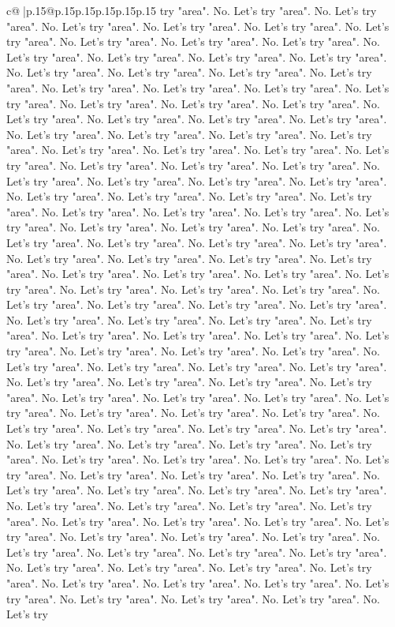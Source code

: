 \documentclass{article}
\begin{document}
{\begin{supertabular}{c@{$\;$}|p{.15\linewidth}@{}p{.15\linewidth}p{.15\linewidth}p{.15\linewidth}p{.15\linewidth}p{.15\linewidth}}
{{{try "area". No. Let's try "area". No. Let's try "area". No. Let's try "area". No. Let's try "area". No. Let's try "area". No. Let's try "area". No. Let's try "area". No. Let's try "area". No. Let's try "area". No. Let's try "area". No. Let's try "area". No. Let's try "area". No. Let's try "area". No. Let's try "area". No. Let's try "area". No. Let's try "area". No. Let's try "area". No. Let's try "area". No. Let's try "area". No. Let's try "area". No. Let's try "area". No. Let's try "area". No. Let's try "area". No. Let's try "area". No. Let's try "area". No. Let's try "area". No. Let's try "area". No. Let's try "area". No. Let's try "area". No. Let's try "area". No. Let's try "area". No. Let's try "area". No. Let's try "area". No. Let's try "area". No. Let's try "area". No. Let's try "area". No. Let's try "area". No. Let's try "area". No. Let's try "area". No. Let's try "area". No. Let's try "area". No. Let's try "area". No. Let's try "area". No. Let's try "area". No. Let's try "area". No. Let's try "area". No. Let's try "area". No. Let's try "area". No. Let's try "area". No. Let's try "area". No. Let's try "area". No. Let's try "area". No. Let's try "area". No. Let's try "area". No. Let's try "area". No. Let's try "area". No. Let's try "area". No. Let's try "area". No. Let's try "area". No. Let's try "area". No. Let's try "area". No. Let's try "area". No. Let's try "area". No. Let's try "area". No. Let's try "area". No. Let's try "area". No. Let's try "area". No. Let's try "area". No. Let's try "area". No. Let's try "area". No. Let's try "area". No. Let's try "area". No. Let's try "area". No. Let's try "area". No. Let's try "area". No. Let's try "area". No. Let's try "area". No. Let's try "area". No. Let's try "area". No. Let's try "area". No. Let's try "area". No. Let's try "area". No. Let's try "area". No. Let's try "area". No. Let's try "area". No. Let's try "area". No. Let's try "area". No. Let's try "area". No. Let's try "area". No. Let's try "area". No. Let's try "area". No. Let's try "area". No. Let's try "area". No. Let's try "area". No. Let's try "area". No. Let's try "area". No. Let's try "area". No. Let's try "area". No. Let's try "area". No. Let's try "area". No. Let's try "area". No. Let's try "area". No. Let's try "area". No. Let's try "area". No. Let's try "area". No. Let's try "area". No. Let's try "area". No. Let's try "area". No. Let's try "area". No. Let's try "area". No. Let's try "area". No. Let's try "area". No. Let's try "area". No. Let's try "area". No. Let's try "area". No. Let's try "area". No. Let's try "area". No. Let's try "area". No. Let's try "area". No. Let's try "area". No. Let's try "area". No. Let's try "area". No. Let's try "area". No. Let's try "area". No. Let's try "area". No. Let's try "area". No. Let's try "area". No. Let's try "area". No. Let's try "area". No. Let's try "area". No. Let's try "area". No. Let's try "area". No. Let's try "area". No. Let's try "area". No. Let's try "area". No. Let's try "area". No. Let's try "area". No. Let's try "area". No. Let's try "area". No. Let's try "area". No. Let's try "area". No. Let's try "area". No. Let's try "area". No. Let's try "area". No. Let's try }}}
\end{supertabular}}
\end{document}
